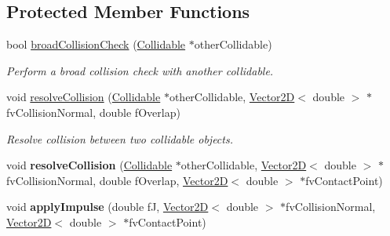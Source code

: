 \subsection*{Protected Member Functions}
\begin{DoxyCompactItemize}
\item 
bool \hyperlink{class_collidable_a3d3ce584cdb14485db044c81a792a966}{broad\+Collision\+Check} (\hyperlink{class_collidable}{Collidable} $\ast$other\+Collidable)
\begin{DoxyCompactList}\small\item\em Perform a broad collision check with another collidable. \end{DoxyCompactList}\item 
void \hyperlink{class_collidable_a40089393c9a030b68042e3b72d8142e4}{resolve\+Collision} (\hyperlink{class_collidable}{Collidable} $\ast$other\+Collidable, \hyperlink{class_vector2_d}{Vector2\+D}$<$ double $>$ $\ast$fv\+Collision\+Normal, double f\+Overlap)
\begin{DoxyCompactList}\small\item\em Resolve collision between two collidable objects. \end{DoxyCompactList}\item 
\hypertarget{class_collidable_a8cefc9d5d6fa5003bbf54df6d76fd74e}{}void {\bfseries resolve\+Collision} (\hyperlink{class_collidable}{Collidable} $\ast$other\+Collidable, \hyperlink{class_vector2_d}{Vector2\+D}$<$ double $>$ $\ast$fv\+Collision\+Normal, double f\+Overlap, \hyperlink{class_vector2_d}{Vector2\+D}$<$ double $>$ $\ast$fv\+Contact\+Point)\label{class_collidable_a8cefc9d5d6fa5003bbf54df6d76fd74e}

\item 
\hypertarget{class_collidable_a2261a16decf40d73a01d1179153d3331}{}void {\bfseries apply\+Impulse} (double f\+J, \hyperlink{class_vector2_d}{Vector2\+D}$<$ double $>$ $\ast$fv\+Collision\+Normal, \hyperlink{class_vector2_d}{Vector2\+D}$<$ double $>$ $\ast$fv\+Contact\+Point)\label{class_collidable_a2261a16decf40d73a01d1179153d3331}

\end{DoxyCompactItemize}
